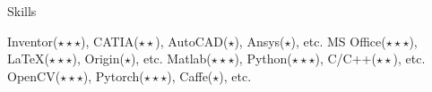 
\begin{rubric}{Skills}

	Inventor($\star\star\star$), CATIA($\star\star$), AutoCAD($\star$), Ansys($\star$), etc.
	MS Office($\star\star\star$), \LaTeX($\star\star\star$), Origin($\star$), etc.
\entry*[Coding]
	Matlab($\star\star\star$), Python($\star\star\star$), C/C++($\star\star$), etc.
	OpenCV($\star\star\star$), Pytorch($\star\star\star$), Caffe($\star$), etc.
\end{rubric}
